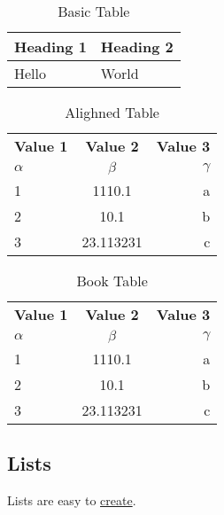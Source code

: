 \documentclass{report}[a4paper,12pt] %
\begin{document}
\begin{table}[!h]
  \centering
  \caption{Basic Table}
  \begin{tabular}{|l|l|}
  \hline
      \textbf{Heading 1} & \textbf{Heading 2} \\ \hline
      Hello & World \\ \hline
  \end{tabular}
  \label{tab:basic}
\end{table}

\begin{table}[h!]
  \begin{center}
    \caption{Alighned Table}
    \label{tab:alighned}
    \begin{tabular}{l|c|r} %
      \textbf{Value 1} & \textbf{Value 2} & \textbf{Value 3}\\
      $\alpha$ & $\beta$ & $\gamma$ \\
      \hline
      1 & 1110.1 & a\\
      2 & 10.1 & b\\
      3 & 23.113231 & c\\
    \end{tabular}
  \end{center}
\end{table}

\begin{table}[h!]
  \centering
  \caption{Book Table}
  \label{tab:book}
  \begin{tabular}{@{}lcr@{}} %
    \toprule %
    \textbf{Value 1} & \textbf{Value 2} & \textbf{Value 3}\\
    $\alpha$ & $\beta$ & $\gamma$ \\
    \midrule %
    1 & 1110.1 & a\\
    2 & 10.1 & b\\
    3 & 23.113231 & c\\
    \bottomrule %
  \end{tabular}
\end{table}

\subsection{Lists}
Lists are easy to \href{https://www.overleaf.com/learn/latex/Lists}{create}.
\end{document}
